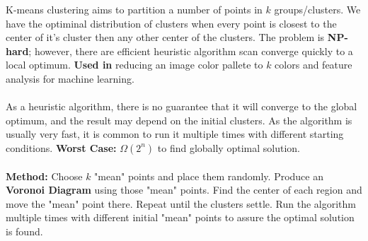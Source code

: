 \documentclass{article}
\begin{document}
		K-means clustering aims to partition a number of points in $k$ groups/clusters. We have the optiminal distribution of clusters when every point is closest to the center of it's cluster then any other center of the clusters. The problem is {\bf NP-hard}; however, there are efficient heuristic algorithm scan converge quickly to a local optimum. {\bf Used in} reducing an image color pallete to $k$ colors and feature analysis for machine learning.
		\\ \\
		As a heuristic algorithm, there is no guarantee that it will converge to the global optimum, and the result may depend on the initial clusters. As the algorithm is usually very fast, it is common to run it multiple times with different starting conditions. {\bf Worst Case:} $\Omega(2^n)$ to find globally optimal solution.
		\\ \\
		{\bf Method:} Choose $k$ "mean" points and place them randomly. Produce an {\bf Voronoi Diagram} using those "mean" points. Find the center of each region and move the "mean" point there. Repeat until the clusters settle. Run the algorithm multiple times with different initial "mean" points to assure the optimal solution is found.
\end{document}
